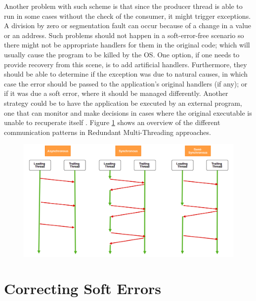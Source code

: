 Another problem with such scheme is that since the producer thread is able to run in some cases without the check of the consumer, it might trigger exceptions. A division by zero or segmentation fault can occur because of a change in a value or an address. Such problems should not happen in a soft-error-free scenario so there might not be appropriate handlers for them in the original code; which will usually cause the program to be killed by the OS. One option, if one needs to provide recovery from this scene, is to add artificial handlers. Furthermore, they should be able to determine if the exception was due to natural causes, in which case the error should be passed to the application's original handlers (if any); or if it was due a soft error, where it should be managed differently. Another strategy could be to have the application be executed by an external program, one that can monitor and make decisions in cases where the original executable is unable to recuperate itself \cite{wang2007compiler} \cite{zhang2012daft}. Figure \ref{fig:RMT} shows an overview of the different communication patterns in Redundant Multi-Threading approaches. 

\begin{figure}[H]
	\centering
	\includegraphics[scale=0.36]{images/RMT.png}
	\label{fig:RMT}
\end{figure}

\pagebreak

\section{Correcting Soft Errors}
\label{sec:correctionPhase}

